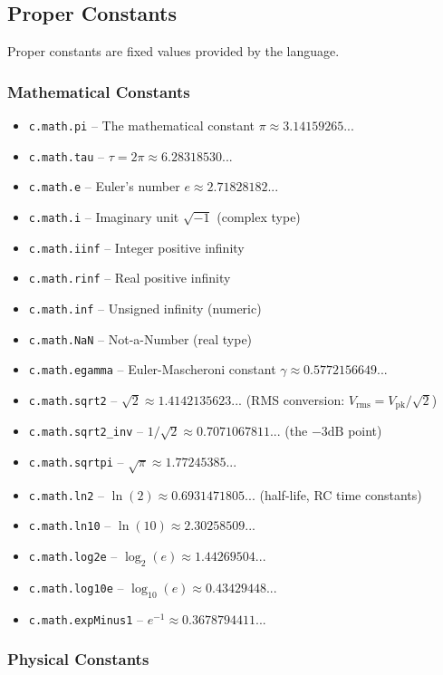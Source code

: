 \subsection{Proper Constants}
Proper constants are fixed values provided by the language.

\subsubsection{Mathematical Constants}
\begin{itemize}
\item \texttt{c.math.pi} -- The mathematical constant $\pi \approx 3.14159265...$
\item \texttt{c.math.tau} -- $\tau = 2\pi \approx 6.28318530...$
\item \texttt{c.math.e} -- Euler's number $e \approx 2.71828182...$
\item \texttt{c.math.i} -- Imaginary unit $\sqrt{-1}$ (complex type)
\item \texttt{c.math.iinf} -- Integer positive infinity
\item \texttt{c.math.rinf} -- Real positive infinity
\item \texttt{c.math.inf} -- Unsigned infinity (numeric)
\item \texttt{c.math.NaN} -- Not-a-Number (real type)
\item \texttt{c.math.egamma} -- Euler-Mascheroni constant $\gamma \approx 0.5772156649...$
\item \texttt{c.math.sqrt2} -- $\sqrt{2} \approx 1.4142135623...$ (RMS conversion: $V_{\text{rms}} = V_{\text{pk}} / \sqrt{2}$)
\item \texttt{c.math.sqrt2\_inv} -- $1/\sqrt{2} \approx 0.7071067811...$ (the $-3\text{dB}$ point)
\item \texttt{c.math.sqrtpi} -- $\sqrt{\pi} \approx 1.77245385...$
\item \texttt{c.math.ln2} -- $\ln(2) \approx 0.6931471805...$ (half-life, RC time constants)
\item \texttt{c.math.ln10} -- $\ln(10) \approx 2.30258509...$
\item \texttt{c.math.log2e} -- $\log_2(e) \approx 1.44269504...$
\item \texttt{c.math.log10e} -- $\log_{10}(e) \approx 0.43429448...$
\item \texttt{c.math.expMinus1} -- $e^{-1} \approx 0.3678794411...$
\end{itemize}

\subsubsection{Physical Constants}
